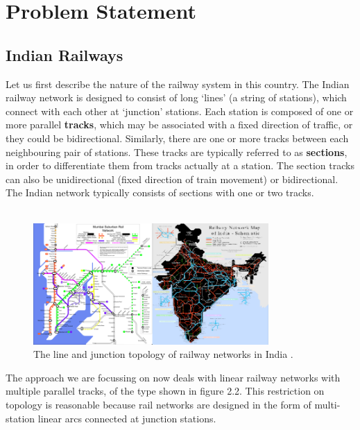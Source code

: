 \chapter{Problem Statement}
\section{Indian Railways}
\hspace{3mm}

Let us ﬁrst describe the nature of the railway system in this country. 
The Indian railway network is designed to consist of long ‘lines’ (a string of stations),
which connect with each other at ‘junction’ stations. Each station is composed 
of one or more parallel \textbf{tracks}, which may be associated with a ﬁxed direction of 
traﬃc, or they could be bidirectional. Similarly, there are one or more tracks 
between each neighbouring pair of stations. These tracks are typically referred 
to as \textbf{sections}, in order to diﬀerentiate them from tracks actually at a station. 
The section tracks can also be unidirectional (ﬁxed direction of train movement)
 or bidirectional. The Indian network typically consists of sections with one or two tracks. 
\\
\\
 \begin{figure}[H]
    \centering
    \includegraphics[width=0.8\textwidth]{Railways_pic}
    \caption{The line and junction topology of railway networks in India \cite{WEBSITE:1}. }
    \label{image-myimage}
\end{figure}

The approach we are focussing on now deals with linear railway 
networks with multiple parallel tracks, of the type shown in figure 2.2. This
restriction on topology is reasonable because rail networks are
designed in the form of multi-station linear arcs connected
at junction stations.

